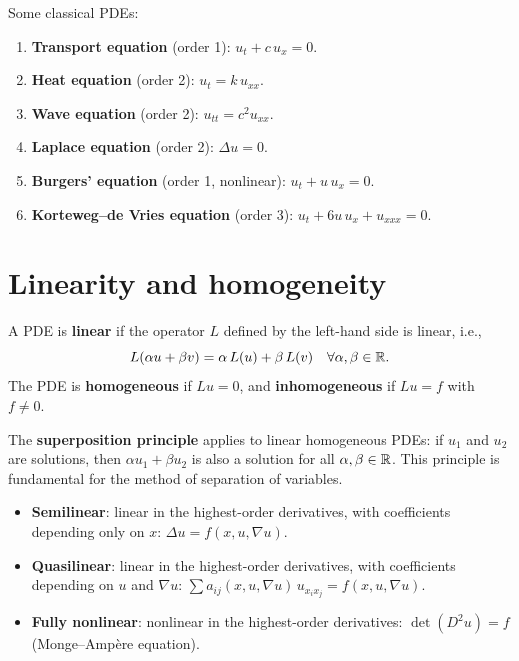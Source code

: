 \begin{example}
Some classical PDEs:
\begin{enumerate}
    \item \textbf{Transport equation} (order 1): $u_t + c\, u_x = 0$.
    \item \textbf{Heat equation} (order 2): $u_t = k\, u_{xx}$.
    \item \textbf{Wave equation} (order 2): $u_{tt} = c^2 u_{xx}$.
    \item \textbf{Laplace equation} (order 2): $\Delta u = 0$.
    \item \textbf{Burgers' equation} (order 1, nonlinear):
          $u_t + u\, u_x = 0$.
    \item \textbf{Korteweg--de Vries equation} (order 3):
          $u_t + 6u\, u_x + u_{xxx} = 0$.
\end{enumerate}
\end{example}

\section{Linearity and homogeneity}

\begin{definition}
A PDE is \textbf{linear} if the operator $L$ defined by the left-hand side
is linear, i.e.,
\[
    L(\alpha u + \beta v) = \alpha\, L(u) + \beta\, L(v)
    \quad \forall \alpha, \beta \in \mathbb{R}.
\]
The PDE is \textbf{homogeneous} if $Lu = 0$, and \textbf{inhomogeneous} if
$Lu = f$ with $f \neq 0$.
\end{definition}

\begin{remark}
The \textbf{superposition principle} applies to linear homogeneous PDEs:
if $u_1$ and $u_2$ are solutions, then $\alpha u_1 + \beta u_2$ is also a
solution for all $\alpha, \beta \in \mathbb{R}$. This principle is fundamental for
the method of separation of variables.
\end{remark}

\begin{definition}
\leavevmode
\begin{itemize}
    \item \textbf{Semilinear}: linear in the highest-order derivatives, with
          coefficients depending only on $x$:
          $\Delta u = f(x, u, \nabla u)$.
    \item \textbf{Quasilinear}: linear in the highest-order derivatives, with
          coefficients depending on $u$ and $\nabla u$:
          $\sum a_{ij}(x, u, \nabla u)\, u_{x_i x_j} = f(x, u, \nabla u)$.
    \item \textbf{Fully nonlinear}: nonlinear in the highest-order
          derivatives: $\det(D^2 u) = f$ (Monge--Amp\`ere equation).
\end{itemize}
\end{definition}

